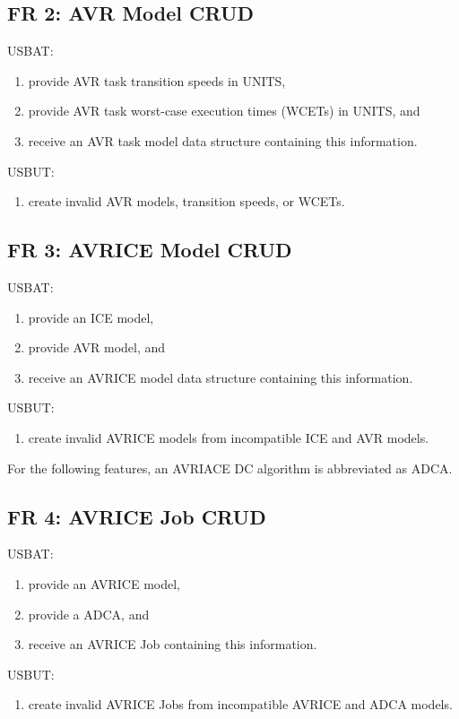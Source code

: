 \documentclass[12pt,a4paper]{article}
\begin{document}
\subsection{FR 2: AVR Model CRUD}
USBAT:
\begin{enumerate}
    \item provide AVR task transition speeds in UNITS,
    \item provide AVR task worst-case execution times (WCETs) in UNITS, and
    \item receive an AVR task model data structure containing this information.
\end{enumerate}
USBUT:
\begin{enumerate}
    \item create invalid AVR models, transition speeds, or WCETs.
\end{enumerate}

\subsection{FR 3: AVRICE Model CRUD}
USBAT:
\begin{enumerate}
    \item provide an ICE model,
    \item provide AVR model, and
    \item receive an AVRICE model data structure containing this information.
\end{enumerate}
USBUT:
\begin{enumerate}
    \item create invalid AVRICE models from incompatible ICE and AVR models.
\end{enumerate}

For the following features, an AVRIACE DC algorithm is abbreviated as ADCA.
\subsection{FR 4: AVRICE Job CRUD}
USBAT:
\begin{enumerate}
    \item provide an AVRICE model,
    \item provide a ADCA, and
    \item receive an AVRICE Job containing this information.
\end{enumerate}
USBUT:
\begin{enumerate}
    \item create invalid AVRICE Jobs from incompatible AVRICE and ADCA models.
\end{enumerate}
\end{document}
